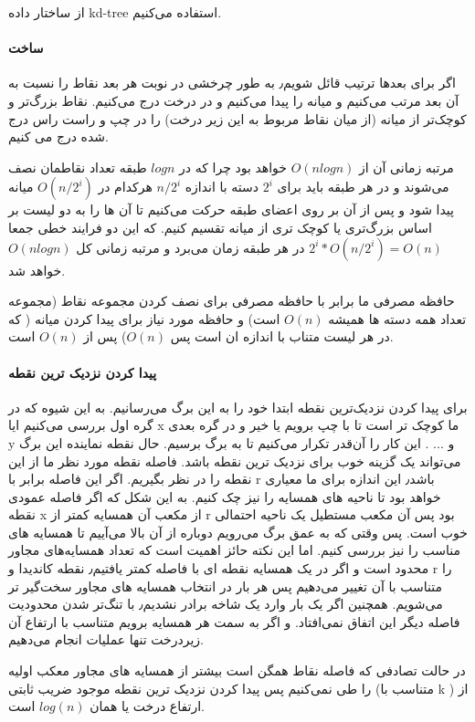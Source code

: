 از ساختار داده 
kd-tree
استفاده می‌کنیم.

\paragraph{ساخت}
اگر برای بعدها ترتیب قائل شویم٫ به طور چرخشی در نوبت هر بعد نقاط را نسبت به آن بعد مرتب می‌کنیم و میانه را پیدا می‌کنیم و در درخت درج می‌کنیم.  نقاط بزرگ‌تر و کوچک‌تر از میانه (از میان نقاط مربوط به این زیر درخت) را در چپ و راست راس درج شده درج می کنیم.

مرتبه زمانی آن از 
$O(nlogn)$
خواهد بود چرا که در 
$logn$ 
طبقه تعداد نقاطمان نصف می‌شوند و 
در هر طبقه باید برای   
$2^i$
دسته با اندازه 
$n/{2^i}$
هرکدام در 
$O(n/{2^i})$
میانه پیدا شود
و پس از آن بر روی  اعضای طبقه  
حرکت می‌کنیم تا آن ها را به دو لیست بر اساس بزرگ‌تری یا کوچک تری از میانه تقسیم کنیم.
 که‌ این دو فرایند خطی جمعا
$2^i * O(n/{2^i}) = O(n)$
در هر طبقه زمان می‌برد و مرتبه زمانی کل
$O(nlogn)$
 خواهد شد.


حافظه مصرفی ما برابر با حافظه مصرفی برای نصف کردن مجموعه نقاط (مجموعه تعداد همه دسته ها همیشه $O(n)$ است) و حافظه مورد نیاز برای پیدا کردن میانه ( که در هر لیست متناب با اندازه ان است پس $O(n)$)
پس از 
$O(n)$ 
است.

\paragraph{پیدا کردن نزدیک ترین نقطه} 
برای پیدا کردن نزدیک‌ترین نقطه ابتدا خود را به این برگ می‌رسانیم. به این شیوه که در گره اول بررسی می‌کنیم ایا x ما کوچک تر است تا با چپ برویم یا خیر و در گره بعدی  y و ... . این کار را آن‌قدر تکرار می‌کنیم تا به برگ برسیم.
حال نقطه نماینده این برگ می‌تواند یک گزینه خوب برای نزدیک ترین نقطه باشد. 
فاصله نقطه مورد نظر ما از این نقطه را در نظر بگیریم.
اگر این فاصله برابر با r باشد٫ این اندازه برای ما معیاری خواهد بود تا ناحیه های همسایه را نیز چک کنیم.
به این شکل که اگر فاصله عمودی نقطه x از مکعب آن همسایه کمتر از r بود پس آن مکعب مستطیل یک ناحیه احتمالی خوب است. پس وقتی که به عمق برگ می‌رویم دوباره از آن بالا می‌آییم تا همسایه های مناسب را نیز بررسی کنیم. اما این نکته حائز اهمیت است که تعداد همسایه‌های مجاور محدود است و اگر در یک همسایه نقطه ای با فاصله کمتر یافتیم٫ نقطه کاندیدا و r را متناسب با آن تغییر می‌دهیم پس هر بار در انتخاب همسایه های مجاور سخت‌گیر تر می‌شویم. همچنین اگر یک بار وارد یک شاخه برادر نشدیم٫ با تنگ‌تر شدن محدودیت فاصله دیگر این اتفاق نمی‌افتاد. و اگر به سمت هر همسایه برویم متناسب با ارتفاع آن زیردرخت تنها عملیات انجام می‌دهیم. 

 در حالت تصادفی که فاصله نقاط همگن است بیشتر از همسایه های مجاور معکب اولیه را طی نمی‌کنیم پس پیدا کردن نزدیک ترین نقطه موجود ضریب ثابتی (متناسب با k ) از ارتفاع درخت یا همان $log(n)$ است.
 
